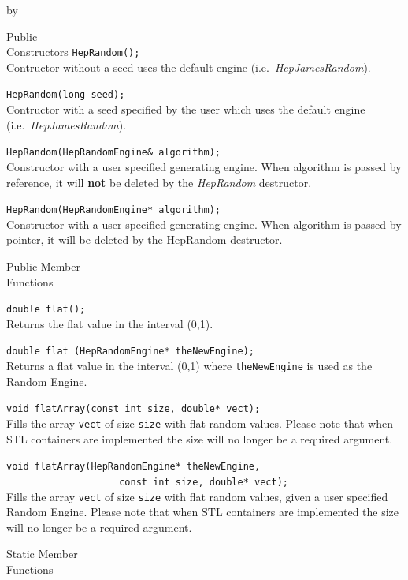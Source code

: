 \documentclass[twoside]{article}
\newcommand{\comp}[1]{\texttt{#1}}%
\newcommand{\entrylabel}[1]{\mbox{\textbf{{#1}}}\hfil}%
\newenvironment{entry}
{\begin{list}{}%
    {\renewcommand{\makelabel}{\entrylabel}%
     \setlength{\labelwidth}{90pt}%
     \setlength{\leftmargin}{\labelwidth}
     \advance\leftmargin by \labelsep%
      }%
    }%
  {\end{list}}
\newcommand{\Entrylabel}[1]%
{\raisebox{0pt}[1ex][0pt]{\makebox[\labelwidth][l]%
    {\parbox[t]{\labelwidth}{\hspace{0pt}\textbf{{#1}}}}}}
\newenvironment{Entry}%
{\renewcommand{\entrylabel}{\Entrylabel}\begin{entry}}%
  {\end{entry}}
\begin{document}
\begin{Entry}
\item[Public\\ Constructors]
      \verb+HepRandom();+\\
      Contructor without a seed uses the default engine (i.e.~{\em HepJamesRandom}).

      \verb+HepRandom(long seed);+\\
      Contructor with a seed specified by the user which uses the
      default engine (i.e.~{\em HepJamesRandom}).

      \verb+HepRandom(HepRandomEngine& algorithm);+\\
       Constructor with a user specified generating engine.
       When algorithm is passed by reference, it will {\bf not}
       be deleted by the {\em HepRandom} destructor.

      \verb+HepRandom(HepRandomEngine* algorithm);+\\
      Constructor with a user specified generating engine. When
      algorithm is passed by pointer, it will be deleted by the
      HepRandom destructor.
  
\item[Public Member\\ Functions]

    \verb+double flat();+\\
    Returns the flat value in the interval (0,1).

    \verb+double flat (HepRandomEngine* theNewEngine);+\\
    Returns a flat value in the interval (0,1)
    where \comp{theNewEngine} is used as the Random Engine.

    \verb+void flatArray(const int size, double* vect);+\\
    Fills the array \comp{vect} of size \comp{size}
    with flat random values.  Please note that when STL containers are
    implemented the size will no longer be a required argument.

    \verb+void flatArray(HepRandomEngine* theNewEngine,+\\ 
    \verb+                    const int size, double* vect);+\\
    Fills the array \comp{vect} of size \comp{size} with flat
    random values, given a user specified Random Engine.
    Please note that when STL containers are implemented the size
    will no longer be a required argument.

\item[Static Member\\ Functions]


\end{Entry}
\end{document}
